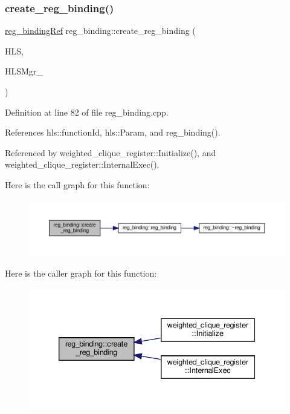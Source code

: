 \subsubsection{\texorpdfstring{create\+\_\+reg\+\_\+binding()}{create\_reg\_binding()}}
{\footnotesize\ttfamily \hyperlink{reg__binding_8hpp_aa41bd7902f9f054af782503a16789fd2}{reg\+\_\+binding\+Ref} reg\+\_\+binding\+::create\+\_\+reg\+\_\+binding (\begin{DoxyParamCaption}\item[{const \hyperlink{hls_8hpp_a75d0c73923d0ddfa28c4843a802c73a7}{hls\+Ref} \&}]{H\+LS,  }\item[{const \hyperlink{hls__manager_8hpp_acd3842b8589fe52c08fc0b2fcc813bfe}{H\+L\+S\+\_\+manager\+Ref}}]{H\+L\+S\+Mgr\+\_\+ }\end{DoxyParamCaption})\hspace{0.3cm}{\ttfamily [static]}}



Definition at line 82 of file reg\+\_\+binding.\+cpp.



References hls\+::function\+Id, hls\+::\+Param, and reg\+\_\+binding().



Referenced by weighted\+\_\+clique\+\_\+register\+::\+Initialize(), and weighted\+\_\+clique\+\_\+register\+::\+Internal\+Exec().

Here is the call graph for this function\+:
\nopagebreak
\begin{figure}[H]
\begin{center}
\leavevmode
\includegraphics[width=350pt]{da/d7c/classreg__binding_a80abb6a0e0eec2dbfbb4e4a8b6b0eda7_cgraph}
\end{center}
\end{figure}
Here is the caller graph for this function\+:
\nopagebreak
\begin{figure}[H]
\begin{center}
\leavevmode
\includegraphics[width=339pt]{da/d7c/classreg__binding_a80abb6a0e0eec2dbfbb4e4a8b6b0eda7_icgraph}
\end{center}
\end{figure}
\mbox{\label{classreg__binding_ad041ee9fb9f1951b5f7a14723aa36983}} 
